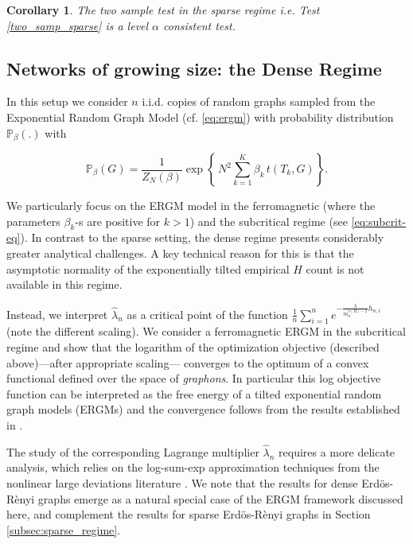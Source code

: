 \documentclass[12pt]{article}
\def\P{\mathbb{P}}
\def\er{ Erd{\"o}s-R{\`e}nyi }
\numberwithin{equation}{section}
\newtheorem{corollary}{Corollary}[section]
\begin{document}
 \begin{corollary}
      The two sample test in the sparse regime i.e. Test \ref{two_samp_sparse} is a level $\alpha$ consistent test.
 \end{corollary}


\subsection{Networks of growing size: the Dense Regime}

In this setup we consider $n$ i.i.d. copies of random graphs sampled from the Exponential Random Graph Model (cf. \eqref{eq:ergm}) with probability distribution $\P_{\beta}(.)$ with

\begin{equation}
\mathbb{P}_\beta(G)
= \frac{1}{Z_N(\beta)}\exp\!\left\{\,N^2\sum_{k=1}^K \beta_k\, t(T_k,G)\right\}.
\end{equation}

We particularly focus on the ERGM model in the ferromagnetic (where the parameters $\beta_k$-s are positive for $k>1$) and the subcritical regime (see \eqref{eq:subcrit-eq}).
In contrast to the sparse setting, the dense regime presents considerably greater analytical challenges. A key technical reason for this is that the asymptotic normality of the exponentially tilted empirical $H$ count is not available in this regime. 

Instead, we interpret $\hat{\lambda}_n$ as a critical point of the function $\frac{1}{n}\sum_{i=1}^n e^{-\frac{\lambda}{m_n^{v(H)-2}} h_{n,i}}$ (note the different scaling). We consider a ferromagnetic ERGM in the subcritical regime and show that the logarithm of the optimization objective (described above)—after appropriate scaling— converges to the optimum of a convex functional defined over the space of {\it graphons}. In particular this log objective function can be interpreted as the free energy of a tilted exponential random graph models (ERGMs) and the convergence follows from the results established in \cite{chatterjee2013estimating}.

The study of the corresponding Lagrange multiplier 
$\hat{\lambda}_n$ requires a more delicate analysis, which relies on the log-sum-exp approximation techniques from the nonlinear large deviations literature \cite{chatterjee2016nonlinear}. We note that the results for dense \er graphs emerge as a natural special case of the ERGM framework discussed here, and complement the results for sparse \er graphs in Section \ref{subsec:sparse_regime}.
\end{document}
